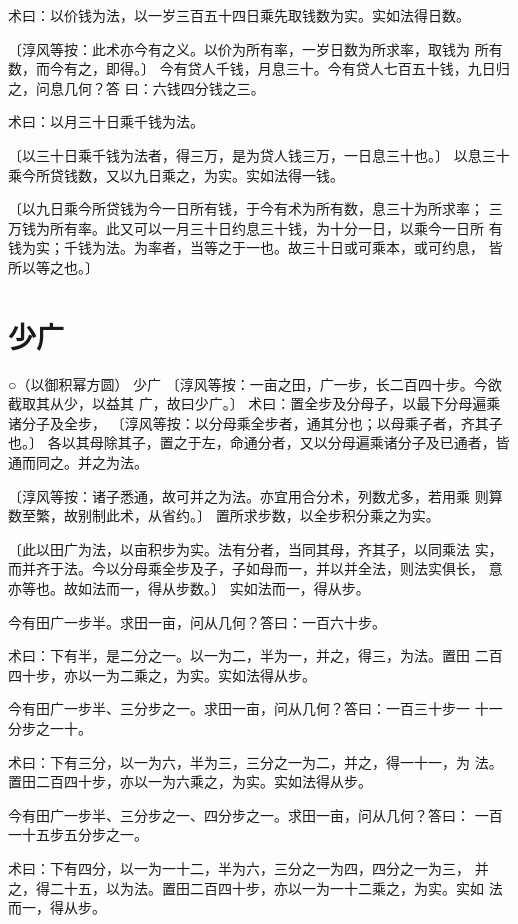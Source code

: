 \documentclass[a4paper,12pt,UTF8,twoside]{ctexbook}
\begin{document}
术曰：以价钱为法，以一岁三百五十四日乘先取钱数为实。实如法得日数。

〔淳风等按：此术亦今有之义。以价为所有率，一岁日数为所求率，取钱为 所有数，而今有之，即得。〕 今有贷人千钱，月息三十。今有贷人七百五十钱，九日归之，问息几何？答 曰：六钱四分钱之三。

术曰：以月三十日乘千钱为法。

〔以三十日乘千钱为法者，得三万，是为贷人钱三万，一日息三十也。〕 以息三十乘今所贷钱数，又以九日乘之，为实。实如法得一钱。

〔以九日乘今所贷钱为今一日所有钱，于今有术为所有数，息三十为所求率； 三万钱为所有率。此又可以一月三十日约息三十钱，为十分一日，以乘今一日所 有钱为实；千钱为法。为率者，当等之于一也。故三十日或可乘本，或可约息， 皆所以等之也。〕 

\chapter{少广}

○（以御积幂方圆） 少广 〔淳风等按：一亩之田，广一步，长二百四十步。今欲截取其从少，以益其 广，故曰少广。〕 术曰：置全步及分母子，以最下分母遍乘诸分子及全步， 〔淳风等按：以分母乘全步者，通其分也；以母乘子者，齐其子也。〕 各以其母除其子，置之于左，命通分者，又以分母遍乘诸分子及已通者，皆 通而同之。并之为法。

〔淳风等按：诸子悉通，故可并之为法。亦宜用合分术，列数尤多，若用乘 则算数至繁，故别制此术，从省约。〕 置所求步数，以全步积分乘之为实。

〔此以田广为法，以亩积步为实。法有分者，当同其母，齐其子，以同乘法 实，而并齐于法。今以分母乘全步及子，子如母而一，并以并全法，则法实俱长， 意亦等也。故如法而一，得从步数。〕 实如法而一，得从步。

今有田广一步半。求田一亩，问从几何？答曰：一百六十步。

术曰：下有半，是二分之一。以一为二，半为一，并之，得三，为法。置田 二百四十步，亦以一为二乘之，为实。实如法得从步。

今有田广一步半、三分步之一。求田一亩，问从几何？答曰：一百三十步一 十一分步之一十。

术曰：下有三分，以一为六，半为三，三分之一为二，并之，得一十一，为 法。置田二百四十步，亦以一为六乘之，为实。实如法得从步。

今有田广一步半、三分步之一、四分步之一。求田一亩，问从几何？答曰： 一百一十五步五分步之一。

术曰：下有四分，以一为一十二，半为六，三分之一为四，四分之一为三， 并之，得二十五，以为法。置田二百四十步，亦以一为一十二乘之，为实。实如 法而一，得从步。
\end{document}
